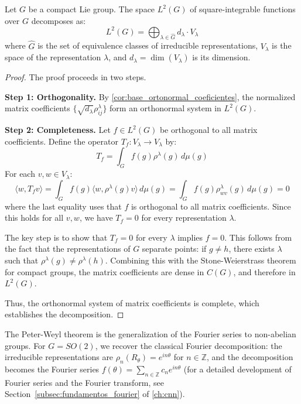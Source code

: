 \begin{theorem}\label{thm:peter_weyl}
Let $G$ be a compact Lie group. The space $L^2(G)$ of square-integrable functions over $G$ decomposes as:
\begin{equation}
L^2(G) = \bigoplus_{\lambda \in \widehat{G}} d_\lambda \cdot V_\lambda
\end{equation}
where $\widehat{G}$ is the set of equivalence classes of irreducible representations, $V_\lambda$ is the space of the representation $\lambda$, and $d_\lambda = \dim(V_\lambda)$ is its dimension.
\end{theorem}

\begin{proof}
The proof proceeds in two steps.

\textbf{Step 1: Orthogonality.} By \autoref{cor:base_ortonormal_coeficientes}, the normalized matrix coefficients $\{\sqrt{d_\lambda} \rho^\lambda_{ij}\}$ form an orthonormal system in $L^2(G)$.

\textbf{Step 2: Completeness.} Let $f \in L^2(G)$ be orthogonal to all matrix coefficients. Define the operator $T_f: V_\lambda \to V_\lambda$ by:
\[
T_f = \int_G f(g) \rho^\lambda(g) \, d\mu(g)
\]
For each $v, w \in V_\lambda$:
\[
\langle w, T_f v \rangle = \int_G f(g) \langle w, \rho^\lambda(g) v \rangle \, d\mu(g) = \int_G f(g) \rho^\lambda_{wv}(g) \, d\mu(g) = 0
\]
where the last equality uses that $f$ is orthogonal to all matrix coefficients. Since this holds for all $v, w$, we have $T_f = 0$ for every representation $\lambda$.

The key step is to show that $T_f = 0$ for every $\lambda$ implies $f = 0$. This follows from the fact that the representations of $G$ separate points: if $g \neq h$, there exists $\lambda$ such that $\rho^\lambda(g) \neq \rho^\lambda(h)$. Combining this with the Stone-Weierstrass theorem for compact groups, the matrix coefficients are dense in $C(G)$, and therefore in $L^2(G)$.

Thus, the orthonormal system of matrix coefficients is complete, which establishes the decomposition.
\end{proof}

The Peter-Weyl theorem is the generalization of the Fourier series to non-abelian groups. For $G = SO(2)$, we recover the classical Fourier decomposition: the irreducible representations are $\rho_n(R_\theta) = e^{in\theta}$ for $n \in \mathbb{Z}$, and the decomposition becomes the Fourier series $f(\theta) = \sum_{n \in \mathbb{Z}} c_n e^{in\theta}$ (for a detailed development of Fourier series and the Fourier transform, see Section~\ref{subsec:fundamentos_fourier} of \autoref{ch:cnn}).

